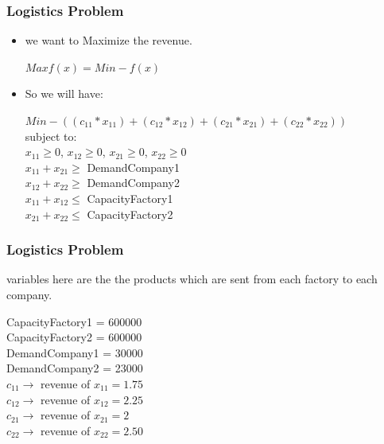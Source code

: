 \documentclass[presentation]{beamer}
\begin{document}
\begin{frame}
  \frametitle{Logistics Problem}
 \begin{itemize} 
  \item we want to Maximize the revenue.\\
  \begin{center}
    $Max f(x) =  Min - f(x)$
  \end{center}

  \item So we will have:\\
  \begin{center}
    $Min  -((c_{11} * x_{11}) + (c_{12} * x_{12}) + (c_{21} * x_{21}) + (c_{22} * x_{22}) )$\\

    subject to:\\

    $x_{11} \geq 0$, $ x_{12} \geq 0$,  $ x_{21} \geq 0$,   $ x_{22} \geq 0$\\
    $x_{11}+x_{21} \geq$ DemandCompany1\\
    $x_{12}+x_{22} \geq$ DemandCompany2\\
    $x_{11}+x_{12} \leq$ CapacityFactory1\\
    $x_{21}+x_{22} \leq$ CapacityFactory2\\
  \end{center}
  \end{itemize}
\end{frame}

\begin{frame}
  \frametitle{Logistics Problem}
  variables here are the the products which are sent from each factory to each company.\\
 
  \begin{center}
    CapacityFactory1 = 600000\\
    CapacityFactory2 = 600000\\

    DemandCompany1 = 30000\\
    DemandCompany2 = 23000\\
    $c_{11} \rightarrow$  revenue of $x_{11} = 1.75$\\
    $c_{12}  \rightarrow$  revenue of $x_{12} = 2.25$\\
    $c_{21} \rightarrow$  revenue of $x_{21} = 2$\\
    $c_{22} \rightarrow$ revenue of $x_{22} = 2.50$

  \end{center} 
\end{frame}

\end{document}
